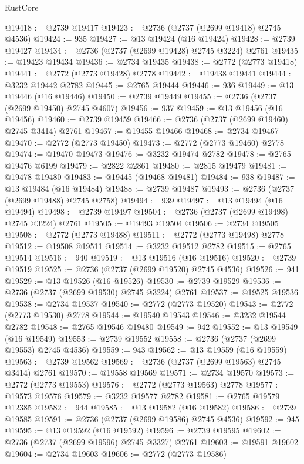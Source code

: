 \begin{lexlean}{RustCore}
\begin{coremodule}
@19418 := @2739 @19417
@19423 := @2736 (@2737 (@2699 @19418) @2745 @4536)
@19424 := 935
@19427 := @13 @19424 (@16 @19424)
@19428 := @2739 @19427
@19434 := @2736 (@2737 (@2699 @19428) @2745 @3224) @2761
@19435 := @19423 @19434
@19436 := @2734 @19435
@19438 := @2772 (@2773 @19418)
@19441 := @2772 (@2773 @19428) @2778
@19442 := @19438 @19441
@19444 := @3232 @19442 @2782
@19445 := @2765 @19444
@19446 := 936
@19449 := @13 @19446 (@16 @19446)
@19450 := @2739 @19449
@19455 := @2736 (@2737 (@2699 @19450) @2745 @4607)
@19456 := 937
@19459 := @13 @19456 (@16 @19456)
@19460 := @2739 @19459
@19466 := @2736 (@2737 (@2699 @19460) @2745 @3414) @2761
@19467 := @19455 @19466
@19468 := @2734 @19467
@19470 := @2772 (@2773 @19450)
@19473 := @2772 (@2773 @19460) @2778
@19474 := @19470 @19473
@19476 := @3232 @19474 @2782
@19478 := @2765 @19476 @6199
@19479 := @2822 @2861
@19480 := @2815 @19479
@19481 := @19478 @19480
@19483 := @19445 (@19468 @19481)
@19484 := 938
@19487 := @13 @19484 (@16 @19484)
@19488 := @2739 @19487
@19493 := @2736 (@2737 (@2699 @19488) @2745 @2758)
@19494 := 939
@19497 := @13 @19494 (@16 @19494)
@19498 := @2739 @19497
@19504 := @2736 (@2737 (@2699 @19498) @2745 @3224) @2761
@19505 := @19493 @19504
@19506 := @2734 @19505
@19508 := @2772 (@2773 @19488)
@19511 := @2772 (@2773 @19498) @2778
@19512 := @19508 @19511
@19514 := @3232 @19512 @2782
@19515 := @2765 @19514
@19516 := 940
@19519 := @13 @19516 (@16 @19516)
@19520 := @2739 @19519
@19525 := @2736 (@2737 (@2699 @19520) @2745 @4536)
@19526 := 941
@19529 := @13 @19526 (@16 @19526)
@19530 := @2739 @19529
@19536 := @2736 (@2737 (@2699 @19530) @2745 @3224) @2761
@19537 := @19525 @19536
@19538 := @2734 @19537
@19540 := @2772 (@2773 @19520)
@19543 := @2772 (@2773 @19530) @2778
@19544 := @19540 @19543
@19546 := @3232 @19544 @2782
@19548 := @2765 @19546 @19480
@19549 := 942
@19552 := @13 @19549 (@16 @19549)
@19553 := @2739 @19552
@19558 := @2736 (@2737 (@2699 @19553) @2745 @4536)
@19559 := 943
@19562 := @13 @19559 (@16 @19559)
@19563 := @2739 @19562
@19569 := @2736 (@2737 (@2699 @19563) @2745 @3414) @2761
@19570 := @19558 @19569
@19571 := @2734 @19570
@19573 := @2772 (@2773 @19553)
@19576 := @2772 (@2773 @19563) @2778
@19577 := @19573 @19576
@19579 := @3232 @19577 @2782
@19581 := @2765 @19579 @12385
@19582 := 944
@19585 := @13 @19582 (@16 @19582)
@19586 := @2739 @19585
@19591 := @2736 (@2737 (@2699 @19586) @2745 @4536)
@19592 := 945
@19595 := @13 @19592 (@16 @19592)
@19596 := @2739 @19595
@19602 := @2736 (@2737 (@2699 @19596) @2745 @3327) @2761
@19603 := @19591 @19602
@19604 := @2734 @19603
@19606 := @2772 (@2773 @19586)

\end{coremodule}
\end{lexlean}
